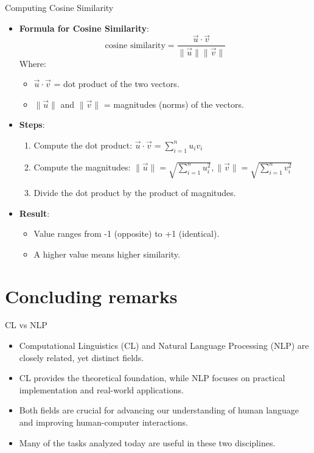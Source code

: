 \documentclass{beamer}
\begin{document}
\begin{frame}{Computing Cosine Similarity}
    \begin{itemize}
        \item \textbf{Formula for Cosine Similarity}:
        \[
        \text{cosine similarity} = \frac{\vec{u} \cdot \vec{v}}{\|\vec{u}\| \|\vec{v}\|}
        \]
        Where:
        \begin{itemize}
            \item \(\vec{u} \cdot \vec{v}\) = dot product of the two vectors.
            \item \(\|\vec{u}\|\) and \(\|\vec{v}\|\) = magnitudes (norms) of the vectors.
        \end{itemize}
        \item \textbf{Steps}:
        \begin{enumerate}
            \item Compute the dot product: \(\vec{u} \cdot \vec{v} = \sum_{i=1}^{n} u_i v_i\)
            \item Compute the magnitudes: \(\|\vec{u}\| = \sqrt{\sum_{i=1}^{n} u_i^2}, \|\vec{v}\| = \sqrt{\sum_{i=1}^{n} v_i^2}\)
            \item Divide the dot product by the product of magnitudes.
        \end{enumerate}
        \item \textbf{Result}:
        \begin{itemize}
            \item Value ranges from -1 (opposite) to +1 (identical).
            \item A higher value means higher similarity.
        \end{itemize}
    \end{itemize}
\end{frame}

\section{Concluding remarks}

\begin{frame}{CL vs NLP}
    \begin{itemize}
        \item Computational Linguistics (CL) and Natural Language Processing (NLP) are closely related, yet distinct fields.
        \item CL provides the theoretical foundation, while NLP focuses on practical implementation and real-world applications.
        \item Both fields are crucial for advancing our understanding of human language and improving human-computer interactions.
        \item Many of the tasks analyzed today are useful in these two disciplines.
    \end{itemize}
\end{frame}
\end{document}
